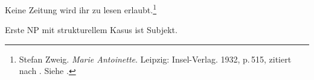 
\ea
Keine Zeitung         wird ihr       zu lesen erlaubt.\footnote{
        Stefan Zweig. \emph{Marie Antoinette}. Leipzig: Insel-Verlag. 1932, p.\,515, 
        zitiert nach . Siehe \citet[]{Askedal88}.
}
\z




Erste NP mit strukturellem Kasus ist Subjekt.















